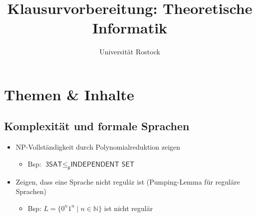 \documentclass[
  a4paper,
  11pt,
]{scrartcl}
\title{Klausurvorbereitung: Theoretische Informatik}
\subtitle{Universität Rostock}
\date{}
\newcommand{\p}{\leq_{\textsf{p}}}
\newcommand{\N}{\mathbb{N}}
\newcommand{\DreiSAT}{\textsf{3SAT}}
\newcommand{\NP}{\textsf{NP}}
\newcommand{\IS}{\textsf{INDEPENDENT SET}}
\begin{document}
\maketitle

\tableofcontents

\section{Themen \& Inhalte}
\label{sec:themen}

\subsection{Komplexität und formale Sprachen}
\label{sub:themen_inhalte_komplexitat_und_formale_sprachen}

\begin{itemize}
  \item \NP-Vollständigkeit durch Polynomialreduktion zeigen
    \begin{itemize}
      \item Bsp: $\DreiSAT \p \IS$
    \end{itemize}
  \item Zeigen, dass eine Sprache nicht regulär ist (Pumping-Lemma für reguläre
    Sprachen)
    \begin{itemize}
      \item Bsp: $L = \{ 0^n 1^n \mid n \in \N \}$ ist nicht regulär


\end{itemize}
\end{itemize}
\end{document}
